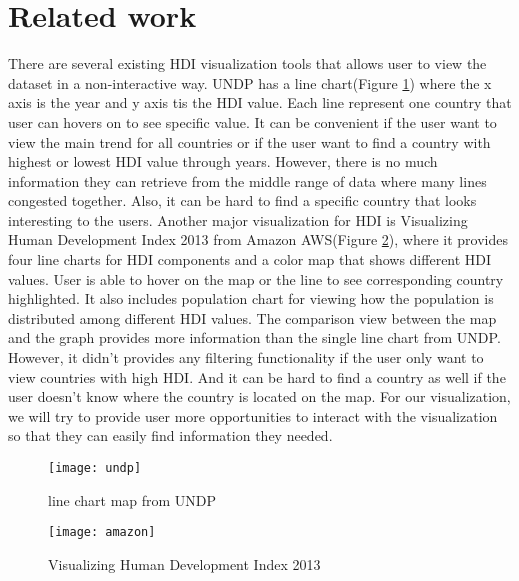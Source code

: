 \section{Related work}
There are several existing HDI visualization tools that allows user to view the dataset in a non-interactive way. UNDP has a line chart(Figure \ref{fig:undp}) where the x axis is the year and y axis tis the HDI value.  Each line represent one country that user can hovers on to see specific value. It can be convenient if the user want to view the main trend for all countries or if the user want to find a country with highest or lowest HDI value through years. However, there is no much information they can retrieve from the middle range of data where many lines congested together. Also, it can be hard to find a specific country that looks interesting to the users. Another major visualization for HDI is Visualizing Human Development Index 2013 from Amazon AWS(Figure \ref{fig:amazon}), where it provides four line charts for HDI components and a color map that shows different HDI values. User is able to hover on the map or the line to see corresponding country highlighted. It also includes population chart for viewing how the population is distributed among different HDI values.  The comparison view between the map and the graph provides more information than the single line chart from UNDP. However, it didn't provides any filtering functionality if the user only want to view countries with high HDI. And it can be hard to find a country as well if the user doesn't know where the country is located on the map. For our visualization, we will try to provide user more opportunities to interact with the visualization so that they can easily find information they needed.
\begin{figure}[h!]
	\texttt{[image: undp]}
	\caption{line chart map from UNDP}
	\label{fig:undp}
\end{figure}
\begin{figure}[h!]
	\texttt{[image: amazon]}
	\caption{Visualizing Human Development Index 2013}
	\label{fig:amazon}
\end{figure}
